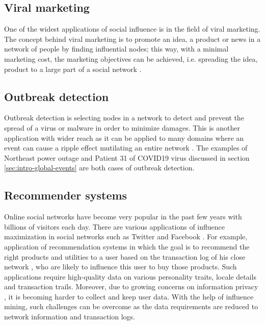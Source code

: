 		\subsection{Viral marketing}
		One of the widest applications of social influence is in the field of viral marketing. The concept behind viral marketing is to promote an idea, a product or news in a network of people by finding influential nodes; this way, with a minimal marketing cost, the marketing objectives can be achieved, i.e. spreading the idea, product to a large part of a social network \cite{tang2017,talukder2018}.

		\subsection{Outbreak detection}
		Outbreak detection is selecting nodes in a network to detect and prevent the spread of a virus or malware in order to minimize damages. This is another application with wider reach as it can be applied to many domains where an event can cause a ripple effect mutilating an entire network \cite{balthrop2004}. The examples of Northeast power outage and Patient 31 of COVID19 virus discussed in section \ref{sec:intro-global-events} are both cases of outbreak detection.
		
		\subsection{Recommender systems}
		Online social networks have become very popular in the past few years with billions of visitors each day. There are various applications of influence maximization in social networks such as Twitter and Facebook \cite{banerjee2020}. For example, application of recommendation systems in which the goal is to recommend the right products and utilities to a user based on the transaction log of his close network \cite{cai2020}, who are likely to influence this user to buy those products. Such applications require high-quality data on various personality traits, locale details and transaction trails. Moreover, due to growing concerns on information privacy \cite{kayes2017}, it is becoming harder to collect and keep user data. With the help of influence mining, such challenges can be overcome as the data requirements are reduced to network information and transaction logs.
		
